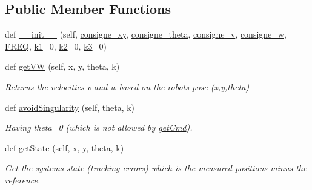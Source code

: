 \subsection*{Public Member Functions}
\begin{DoxyCompactItemize}
\item 
def \hyperlink{classcmd__TTB_1_1controllers_1_1TrajectoryStabilisator_ad42379fbbd0ec30bdc425e81fd47611f}{\+\_\+\+\_\+init\+\_\+\+\_\+} (self, \hyperlink{classcmd__TTB_1_1controllers_1_1TrajectoryStabilisator_a6eb1c01d0f7628c9c55aba2e1c1a5f87}{consigne\+\_\+xy}, \hyperlink{classcmd__TTB_1_1controllers_1_1TrajectoryStabilisator_a8a5025ec66995976f3c7bd6d976cb426}{consigne\+\_\+theta}, \hyperlink{classcmd__TTB_1_1controllers_1_1TrajectoryStabilisator_a7aacf24b292c214b7507ed7ff775d9d8}{consigne\+\_\+v}, \hyperlink{classcmd__TTB_1_1controllers_1_1TrajectoryStabilisator_a66ceabf25b6fc0f738457520d8a6b72d}{consigne\+\_\+w}, \hyperlink{classcmd__TTB_1_1controllers_1_1TrajectoryStabilisator_aedda44c52c85b3984f4c58b4d6157575}{F\+R\+EQ}, \hyperlink{classcmd__TTB_1_1controllers_1_1TrajectoryStabilisator_a82d3c2d639861e91f72560750417920e}{k1}=0, \hyperlink{classcmd__TTB_1_1controllers_1_1TrajectoryStabilisator_af96b6610b96e8a7d036848bf168c2c01}{k2}=0, \hyperlink{classcmd__TTB_1_1controllers_1_1TrajectoryStabilisator_abe267c474aea918130fd31fdfe818938}{k3}=0)
\item 
def \hyperlink{classcmd__TTB_1_1controllers_1_1TrajectoryStabilisator_a7a3a50c500ed52611cfc72a5d1e0804d}{get\+VW} (self, x, y, theta, k)
\begin{DoxyCompactList}\small\item\em Returns the velocities v and w based on the robot\textquotesingle{}s pose (x,y,theta) \end{DoxyCompactList}\item 
def \hyperlink{classcmd__TTB_1_1controllers_1_1TrajectoryStabilisator_aa4adb81d4e63a8d861722a62806638c7}{avoid\+Singularity} (self, theta, k)
\begin{DoxyCompactList}\small\item\em Having theta=0 (which is not allowed by \hyperlink{classcmd__TTB_1_1controllers_1_1TrajectoryStabilisator_a554b57b36fcb2f9f1d0b87058ed9992e}{get\+Cmd}). \end{DoxyCompactList}\item 
def \hyperlink{classcmd__TTB_1_1controllers_1_1TrajectoryStabilisator_a9dba372897104d13678ed72114abd7e8}{get\+State} (self, x, y, theta, k)
\begin{DoxyCompactList}\small\item\em Get the system\textquotesingle{}s state (tracking errors) which is the measured positions minus the reference. \end{DoxyCompactList}\item 

\end{DoxyCompactItemize}
